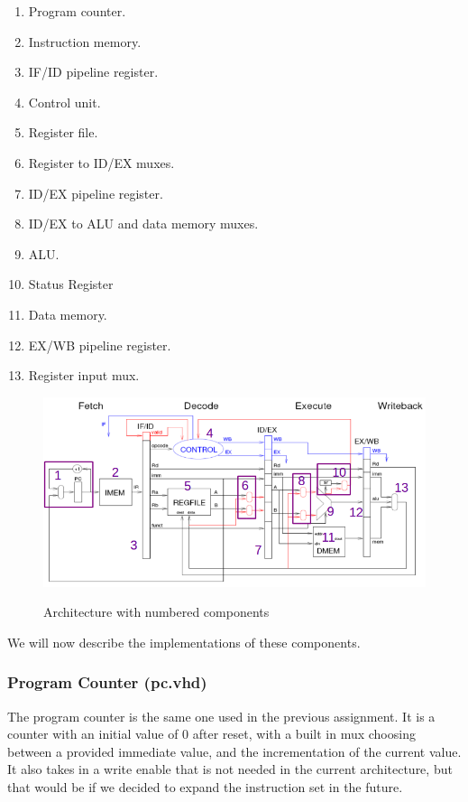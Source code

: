 \documentclass[11pt]{report}
\begin{document}
\begin{enumerate}
\item Program counter.
\item Instruction memory.
\item IF/ID pipeline register.
\item Control unit.
\item Register file.
\item Register to ID/EX muxes.
\item ID/EX pipeline register.
\item ID/EX to ALU and data memory muxes.
\item ALU.
\item Status Register
\item Data memory.
\item EX/WB pipeline register.
\item Register input mux.
\end{enumerate}

\begin{figure}[htbp]
  \centering
  \includegraphics[width=0.95\linewidth]{toplevelmarked.png} \\
  \caption{Architecture with numbered components}
  \label{fig:archnumbered}
\end{figure}
	
We will now describe the implementations of these components.
\subsubsection*{Program Counter (pc.vhd)}
The program counter is the same one used in the previous assignment. 
It is a counter with an initial value of 0 after reset, with a built in
mux choosing between a provided immediate value, and the incrementation of
the current value. It also takes in a write enable that is not needed in
the current architecture, but that would be if we decided to expand the 
instruction set in the future.
\end{document}
